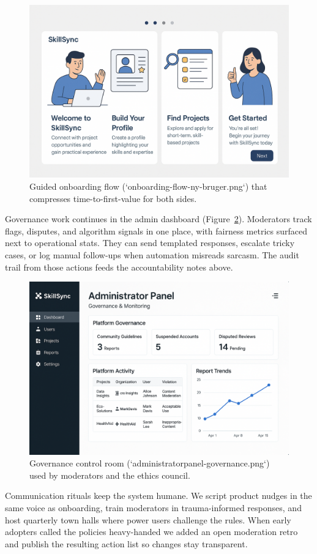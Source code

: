 \begin{figure}[h]
  \centering
  \includegraphics[width=0.85\linewidth]{figures/opgave05/onboarding-flow-ny-bruger.png}
  \caption{Guided onboarding flow (`onboarding-flow-ny-bruger.png`) that compresses time-to-first-value for both sides.}
  \label{fig:onboarding-flow}
\end{figure}

Governance work continues in the admin dashboard (Figure~\ref{fig:admin-panel}). Moderators track flags, disputes, and algorithm signals in one place, with fairness metrics surfaced next to operational stats. They can send templated responses, escalate tricky cases, or log manual follow-ups when automation misreads sarcasm. The audit trail from those actions feeds the accountability notes above.

\begin{figure}[h]
  \centering
  \includegraphics[width=0.85\linewidth]{figures/opgave05/administratorpanel-governance.png}
  \caption{Governance control room (`administratorpanel-governance.png`) used by moderators and the ethics council.}
  \label{fig:admin-panel}
\end{figure}

Communication rituals keep the system humane. We script product nudges in the same voice as onboarding, train moderators in trauma-informed responses, and host quarterly town halls where power users challenge the rules. When early adopters called the policies heavy-handed we added an open moderation retro and publish the resulting action list so changes stay transparent.
